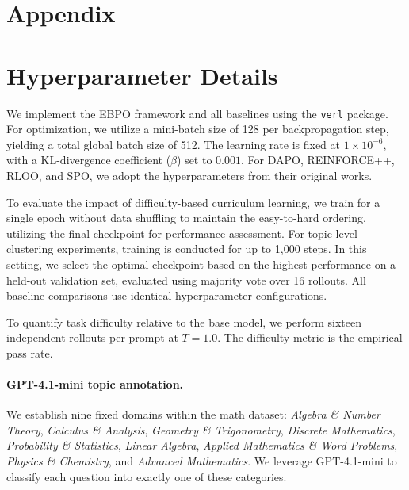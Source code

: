 \documentclass{article}
\theoremstyle{plain}
\theoremstyle{definition}
\theoremstyle{remark}
\begin{document}




\appendix

\section*{Appendix}



\section{Hyperparameter Details}
\label{sec:hyper_details}
We implement the EBPO framework and all baselines using the \texttt{verl} package. For optimization, we utilize a mini-batch size of 128 per backpropagation step, yielding a total global batch size of 512. The learning rate is fixed at $1\times10^{-6}$, with a KL-divergence coefficient ($\beta$) set to $0.001$. For DAPO, REINFORCE++, RLOO, and SPO, we adopt the hyperparameters from their original works.

To evaluate the impact of difficulty-based curriculum learning, we train for a single epoch without data shuffling to maintain the easy-to-hard ordering, utilizing the final checkpoint for performance assessment. For topic-level clustering experiments, training is conducted for up to 1{,}000 steps. In this setting, we select the optimal checkpoint based on the highest performance on a held-out validation set, evaluated using majority vote over 16 rollouts. All baseline comparisons use identical hyperparameter configurations.

To quantify task difficulty relative to the base model, we perform sixteen independent rollouts per prompt at $T=1.0$. The difficulty metric is the empirical pass rate.

\paragraph{GPT-4.1-mini topic annotation.}
We establish nine fixed domains within the math dataset: \emph{Algebra \& Number Theory}, \emph{Calculus \& Analysis}, \emph{Geometry \& Trigonometry}, \emph{Discrete Mathematics}, \emph{Probability \& Statistics}, \emph{Linear Algebra}, \emph{Applied Mathematics \& Word Problems}, \emph{Physics \& Chemistry}, and \emph{Advanced Mathematics}. We leverage GPT-4.1-mini \citep{achiam2023gpt} to classify each question into exactly one of these categories.
\end{document}
